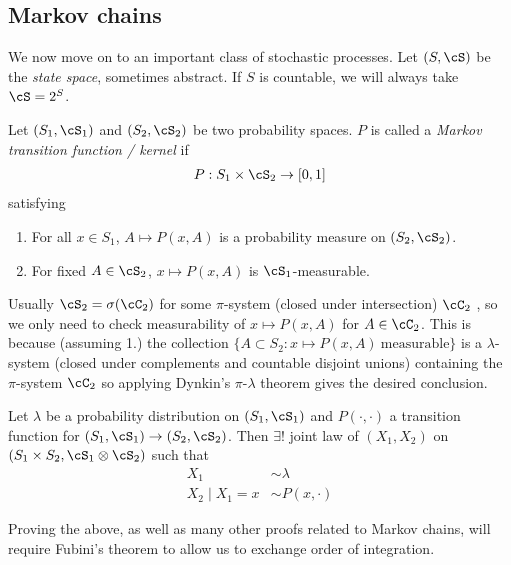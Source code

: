 \subsection{Markov chains}
\label{sub:Markov chains}

We now move on to an important class of stochastic processes.
Let $(S, \cS)$ be the \emph{state space}, sometimes abstract.
If $S$ is countable, we will always take $\cS = 2^S$.

\begin{definition}
  Let $(S_1, \cS_1)$ and $(S_2, \cS_2)$
  be two probability spaces.
  $P$ is called a \emph{Markov transition function / kernel} if
  \begin{align*}
    P : S_1 \times \cS_2 \to [0,1]
  \end{align*}
  satisfying
  \begin{enumerate}
    \item For all $x \in S_1$, $A \mapsto P(x, A)$ is a probability measure
      on $(S_2, \cS_2)$.
    \item For fixed $A \in \cS_2$, $x \mapsto P(x, A)$ is $\cS_1$-measurable.
  \end{enumerate}
\end{definition}

Usually $\cS_2 = \sigma(\cC_2)$ for some $\pi$-system
(closed under intersection) $\cC_2$ , so we only need to check
measurability of $x \mapsto P(x, A)$ for $A \in \cC_2$. This is because
(assuming 1.) the collection
$\{A \subset S_2: x \mapsto P(x, A)~\text{measurable}\}$
is a $\lambda$-system (closed under complements and countable disjoint unions)
containing the $\pi$-system $\cC_2$
so applying Dynkin's $\pi$-$\lambda$ theorem gives the desired conclusion.

\begin{theorem}
  Let $\lambda$ be a probability distribution on $(S_1, \cS_1)$
  and $P(\cdot, \cdot)$ a transition function for $(S_1, \cS_1) \to (S_2, \cS_2)$.
  Then $\exists ! $ joint law of $(X_1, X_2)$ on
  $(S_1 \times S_2, \cS_1 \otimes \cS_2)$ such that
  \begin{align*}
    X_1 &\sim \lambda \\
    X_2 \mid X_1 = x &\sim P(x, \cdot)
  \end{align*}
\end{theorem}

Proving the above, as well as many other proofs related to Markov chains,
will require Fubini's theorem to allow us to exchange order of integration.

